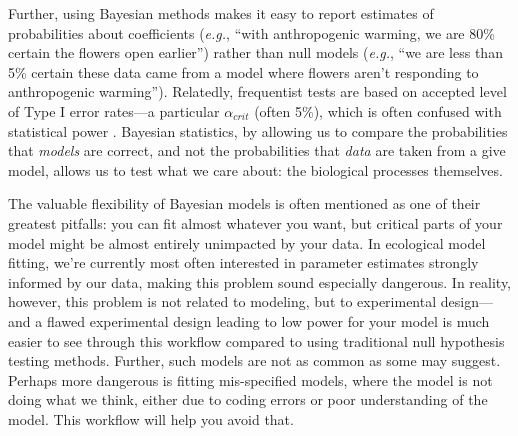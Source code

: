 \documentclass[11pt]{article}
\begin{document}
Further, using Bayesian methods makes it easy to report estimates of probabilities about coefficients (\emph{e.g.}, ``with anthropogenic warming, we are 80\% certain the flowers open earlier'') rather than null models (\emph{e.g.}, ``we are less than 5\% certain these data came from a model where flowers aren't responding to anthropogenic warming''). Relatedly, frequentist tests are based on accepted level of Type I error rates---a particular $\alpha_{crit}$ (often 5\%), which is often confused with statistical power  \citep[$\beta$, the probability that we would detect a true effect is dependent on, but separate from $\alpha_{crit}$; in reality, though most ecological studies use an $\alpha_{crit}$ of 0.05, statistical power is usually very low,][]{jennions2003survey}. Bayesian statistics, by allowing us to compare the probabilities that \emph{models} are correct, and not the probabilities that \emph{data} are taken from a give model, allows us to test what we care about: the biological processes themselves.

The valuable flexibility of Bayesian models is often mentioned as one of their greatest pitfalls: you can fit almost whatever you want, but critical parts of your model might be almost entirely unimpacted by your data. In ecological model fitting, we're currently most often interested in parameter estimates strongly informed by our data, making this problem sound especially dangerous. In reality, however, this problem is not related to modeling, but to experimental design---and a flawed experimental design leading to low power for your model is much easier to see through this workflow compared to using traditional null hypothesis testing methods. Further, such models are not as common as some may suggest. Perhaps more dangerous is fitting mis-specified models, where the model is not doing what we think, either due to coding errors or poor understanding of the model. This workflow will help you avoid that. %
\end{document}
